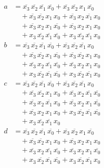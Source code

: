 \documentclass[12pt,a4paper]{article}
\begin{document}
\[
\begin{aligned}
    a &= \overline{x_3}\,\overline{x_2}\,\overline{x_1}\,\overline{x_0}
    + \overline{x_3}\,\overline{x_2}\,x_1\,\overline{x_0} \\
    &\quad + \overline{x_3}\,\overline{x_2}\,x_1\,x_0
    + \overline{x_3}\,x_2\,\overline{x_1}\,x_0 \\
    &\quad + \overline{x_3}\,x_2\,x_1\,\overline{x_0}
    + \overline{x_3}\,x_2\,x_1\,x_0 \\
    &\quad + x_3\,\overline{x_2}\,\overline{x_1}\,\overline{x_0}
    + x_3\,\overline{x_2}\,\overline{x_1}\,x_0 \\[4pt]
    b &= \overline{x_3}\,\overline{x_2}\,\overline{x_1}\,\overline{x_0}
    + \overline{x_3}\,\overline{x_2}\,\overline{x_1}\,x_0 \\
    &\quad + \overline{x_3}\,\overline{x_2}\,x_1\,\overline{x_0}
    + \overline{x_3}\,\overline{x_2}\,x_1\,x_0 \\
    &\quad + \overline{x_3}\,x_2\,\overline{x_1}\,\overline{x_0}
    + \overline{x_3}\,x_2\,x_1\,x_0 \\
    &\quad + x_3\,\overline{x_2}\,\overline{x_1}\,\overline{x_0}
    + x_3\,\overline{x_2}\,\overline{x_1}\,x_0 \\[4pt]
    c &= \overline{x_3}\,\overline{x_2}\,\overline{x_1}\,\overline{x_0}
    + \overline{x_3}\,\overline{x_2}\,\overline{x_1}\,x_0 \\
    &\quad + \overline{x_3}\,\overline{x_2}\,x_1\,x_0
    + \overline{x_3}\,x_2\,\overline{x_1}\,\overline{x_0} \\
    &\quad + \overline{x_3}\,x_2\,\overline{x_1}\,x_0
    + \overline{x_3}\,x_2\,x_1\,\overline{x_0} \\
    &\quad + \overline{x_3}\,x_2\,x_1\,x_0
    + x_3\,\overline{x_2}\,\overline{x_1}\,\overline{x_0} \\
    &\quad + x_3\,\overline{x_2}\,\overline{x_1}\,x_0 \\[4pt]
    d &= \overline{x_3}\,\overline{x_2}\,\overline{x_1}\,\overline{x_0}
    + \overline{x_3}\,\overline{x_2}\,x_1\,\overline{x_0} \\
    &\quad + \overline{x_3}\,\overline{x_2}\,x_1\,x_0
    + \overline{x_3}\,x_2\,x_1\,x_0 \\
    &\quad + \overline{x_3}\,x_2\,\overline{x_1}\,\overline{x_0}
    + \overline{x_3}\,x_2\,x_1\,\overline{x_0} \\
    &\quad + x_3\,\overline{x_2}\,\overline{x_1}\,\overline{x_0}
    + x_3\,\overline{x_2}\,\overline{x_1}\,x_0 \\[4pt]

\end{aligned}\]
\end{document}
